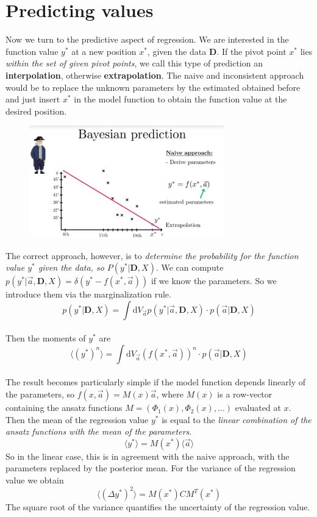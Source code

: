 \documentclass[12pt, a4paper]{scrartcl}
\begin{document}
\section*{Predicting values}
Now we turn to the predictive aspect of regression. We are interested in the
function value $y^*$ at a new position $x^*$, given the data $\boldsymbol{D}$. If the pivot point
$x^*$ lies \textit{within the set of given pivot points}, we call this type of prediction an
\textbf{interpolation}, otherwise \textbf{extrapolation}. The naive and inconsistent approach
would be to replace the unknown parameters by the estimated obtained before 
and just insert $x^*$ in the model function to obtain the function value
at the desired position. \\%
\begin{figure}[H]
	\centering
	\includegraphics[width=0.75\textwidth]{7_8.png}
\end{figure}
The correct approach, however, is to \textit{determine the probability for the function 
value $y^*$ given the data, so $P(y^*|\boldsymbol{D},X)$}.
We can compute $p(y^*|\vec{a},\boldsymbol{D},X)=\delta(y^*-f(x^*,\vec{a}))$ if we know the parameters. So we introduce
them via the marginalization rule.%
\begin{equation*}\boxed{p(y^*|\boldsymbol{D},X)=\int \text{d}V_{\vec{a}}p(y^*|\vec{a},\boldsymbol{D},X) \cdot p(\vec{a}|\boldsymbol{D},X)
}\end{equation*}\\
 Then the moments of $y^*$ are 
 \begin{equation*}\boxed{\langle (y^*)^n\rangle=\int \text{d}V_{\vec{a}}(f(x^*,\vec{a}))^n \cdot p(\vec{a}|\boldsymbol{D},X)
}\end{equation*}\\
The result becomes particularly simple if the model function depends
linearly of the parameters, so $f(x,\vec{a})=M(x)\vec{a}$, where $M(x)$ is a row-vector containing the ansatz functions $M=(\Phi_1(x),\Phi_2(x),...)$
evaluated at $x$. Then the mean of the regression value $y^*$ is equal to the \textit{linear combination
of the ansatz functions with the mean of the parameters}.
\[\langle y^*\rangle = M(x^*)\langle \vec{a}\rangle\]
So in the linear case, this is in agreement with the naive approach, with the
parameters replaced by the posterior mean.
For the variance of the regression value we obtain
\[\langle (\Delta y^*)^2\rangle = M(x^*)CM^T(x^*)\]
The square root of the variance quantifies the uncertainty of the regression
value.\\%
\end{document}
